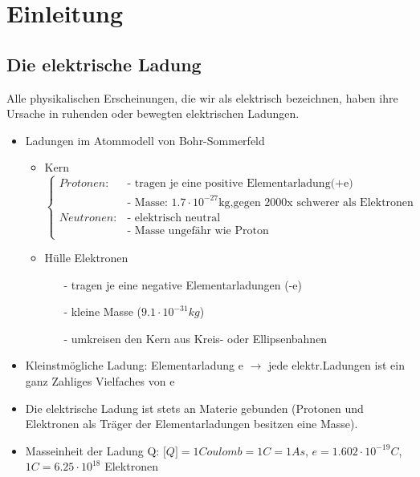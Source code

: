 \section{Einleitung}
\subsection{Die elektrische Ladung}
Alle physikalischen Erscheinungen, die wir als elektrisch bezeichnen, haben ihre Ursache in
ruhenden oder bewegten elektrischen Ladungen.
\linebreak

\begin{itemize}
	\item Ladungen im Atommodell von Bohr-Sommerfeld\\
	\begin{itemize}
			\item Kern 
			$\begin{cases}
				Protonen:  & \text{- tragen je eine positive Elementarladung(+e)}\\ & \text{- Masse: $1.7 \cdot 10^{-27}$kg,gegen 2000x schwerer als 					Elektronen}\\
				Neutronen: & \text{- elektrisch neutral}\\ & \text{- Masse ungefähr wie Proton}
			\end{cases}$\\
			\item Hülle Elektronen
			\begin{itemize}
				\item[-] tragen je eine negative Elementarladungen (-e)\\
				\item[-] kleine Masse ($9.1 \cdot 10^{-31}kg$)\\
				\item[-] umkreisen den Kern aus Kreis- oder Ellipsenbahnen\\
			\end{itemize}
		\end{itemize}
	\item Kleinstmögliche Ladung: Elementarladung e $\rightarrow$ jede elektr.Ladungen ist ein ganz Zahliges Vielfaches von e\\
	\item Die elektrische Ladung ist stets an Materie gebunden (Protonen und Elektronen als Träger
der Elementarladungen besitzen eine Masse).
	\item Masseinheit der Ladung Q: $ \lbrack Q \rbrack = 1 Coulomb = 1 C = 1 As$, $ e = 1.602\cdot 10^{-19} C$, $1 C = 6.25\cdot 10^{18}$ Elektronen

\end{itemize}
